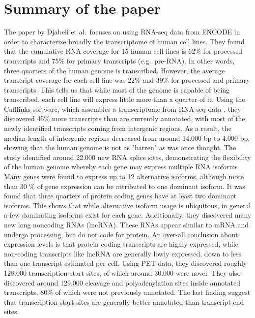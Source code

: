 \section{Summary of the paper}
The paper by Djabeli et al.\ focuses on using RNA-seq data from ENCODE in
order to characterize broadly the transcriptome of human cell lines. They found that
the cumulative RNA coverage for 15 human cell lines is 62\% for processed
transcripts and 75\% for primary transcripts (e.g.\ pre-RNA). In other words,
three quarters of the human genome is transcribed. However, the average
transcript coverage for each cell line was 22\% and 39\% for processed and
primary transcripts. This tells us that while most of the genome is capable of
being transcribed, each cell line will express little more than a quarter of
it. Using the Cufflinks software, which assembles a transcriptome from RNA-seq
data \cite{trapnell_transcript_2010}, they discovered 45\% more transcripts
than are currently annotated, with most of the newly identified transcripts
coming from intergenic regions. As a result, the median length of intergenic
regions decreased from around 14.000 bp to 4.000 bp, showing that the human
genome is not as "barren" as was once thought. The study identified around
22.000 new RNA splice sites, demonstrating the flexibility of the human genome
whereby each gene may express multiple RNA isoforms. Many genes were found to
express up to 12 alternative isoforms, although more than 30 \% of gene
expression can be attributed to one dominant isoform. It was found that three
quarters of protein coding genes have at least two dominant isoforms. This
shows that while alternative isoform usage is ubiquitous, in general a few
dominating isoforms exist for each gene. Additionally, they discovered many new
long noncoding RNAs (lncRNA). These RNAs appear similar to mRNA and undergo
processing, but do not code for protein. An over-all conclusion about
expression levels is that protein coding transcripts are highly expressed,
while non-coding transcripts like lncRNA are generally lowly expressed, down to
less than one transcript estimated per cell. Using PET-data, they discovered
roughly 128.000 transcription start sites, of which around 30.000 were novel.
They also discovered around 129.000 cleavage and polyadenylation sites inside
annotated transcripts, 80\% of which were not previously annotated. The last
finding suggest that transcription start sites are generally better annotated
than transcript end sites.


